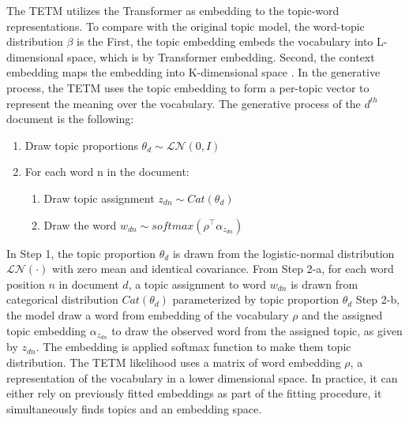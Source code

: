 The TETM utilizes the Transformer as embedding to the topic-word representations. To compare with the original topic model, the word-topic distribution $ \beta $ is the 
First, the topic embedding embeds the vocabulary into L-dimensional space, which is by Transformer embedding. Second, the context embedding maps the embedding into K-dimensional space . 
In the generative process, the TETM uses the topic embedding to form a per-topic vector to represent the meaning over the vocabulary. 
The generative process of the $ d^{th} $ document is the following:
\begin{enumerate}
\item Draw topic proportions $ \theta_d\sim\mathcal{LN}(0,I) $
\item For each word n in the document:
\begin{enumerate}
\item Draw topic assignment $ z_{dn}\sim Cat(\theta_d) $
\item Draw the word $ w_{dn}\sim softmax(\rho^\top\alpha_{z_{dn}}) $
\end{enumerate}
\end{enumerate}
In Step 1, the topic proportion $ \theta_d $ is drawn from the logistic-normal distribution $ \mathcal{LN}(\cdot) $ with zero mean and identical covariance.
From Step 2-a, for each word position $ n $ in document $ d $, a topic assignment to word $ w_{dn} $ is drawn from categorical distribution $ Cat(\theta_d) $ parameterized by topic proportion $ \theta_d $
Step 2-b, the model draw a word from embedding of the vocabulary $ \rho $ and the assigned topic embedding $ \alpha_{z_{dn}} $ to draw the observed word from the assigned topic, as given by $ z_{dn} $. The embedding is applied softmax function to make them topic distribution.
The TETM likelihood uses a matrix of word embedding $ \rho $, a representation of the vocabulary in a lower dimensional space. In practice, it can either rely on previously fitted embeddings as part of the fitting procedure, it simultaneously finds topics and an embedding space.